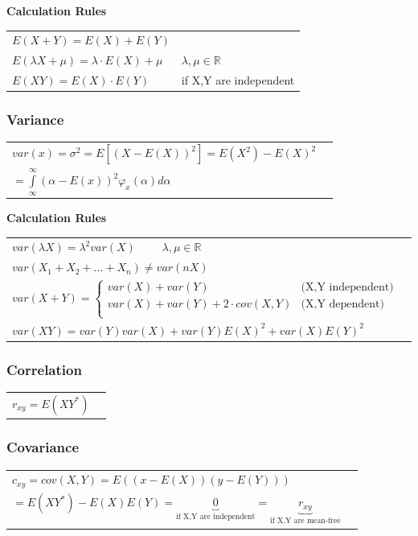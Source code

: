 	
			\textbf{Calculation Rules}\\
				\begin{tabular}{ll}
				$E(X+Y)=E(X)+E(Y)$\\
				$E(\lambda X + \mu)=\lambda \cdot E(X) + \mu$ & $\lambda, \mu \in \mathbb{R}$\\
				$E(XY) = E(X)\cdot E(Y)$ & if X,Y are independent\\
				\end{tabular}
	
      
		\subsubsection{Variance}

			\begin{tabular}{ll}
			$var(x)=\sigma ^2=E[(X-E(X))^2]=E(X^2)-E(X)^2$\\$=\int\limits_\infty^\infty(\alpha - E(x))^2\varphi_x(\alpha)d\alpha$\\
			\end{tabular}
			
			\textbf{Calculation Rules}\\
				\begin{tabular}{ll}
				$var(\lambda X)=\lambda^2 var(X) \qquad $ $\lambda, \mu \in
				\mathbb{R}$\\ 
				$var(X_1+X_2+\ldots+X_n) \neq var(n X)$ \\
				$var(X+Y)= \begin{cases}
								var(X)+var(Y)
								&   \text{(X,Y independent)}\\                     
								var(X) + var(Y) + 2 \cdot cov(X,Y) 
								&   \text{(X,Y dependent)}\\
							\end{cases} $ \\
				$var(X Y)= var(Y)var(X)+var(Y)E(X)^2+var(X)E(Y)^2$
				\end{tabular}
	
		\subsubsection{Correlation}
		\begin{tabular}{ll}
        $r_{xy}=E(XY^*)$
        \end{tabular}
		\subsubsection{Covariance}
		\begin{tabular}{ll}
			$c_{xy}=cov(X,Y)=E((x-E(X))(y-E(Y)))$\\$=E(XY^*)-E(X)E(Y)=\underbrace{0}_{\text{if X,Y are independent}}=
			\underbrace{r_{xy}}_{\text{if X,Y are mean-free}}$
		\end{tabular}
